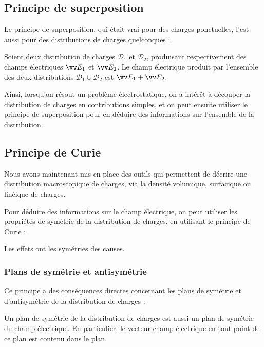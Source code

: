\documentclass[11pt,fleqn]{book} %
\begin{document}
\subsection{Principe de superposition}

Le principe de superposition, qui était vrai pour des charges ponctuelles, l'est aussi pour des distributions de charges quelconques :
\begin{theorem}
    Soient deux distribution de charges $\mathcal{D}_1$ et $\mathcal{D}_2$, produisant respectivement des champs électriques $\vv E_1$ et $\vv E_2$. Le champ électrique produit par l'ensemble des deux distributions $\mathcal{D}_1 \cup \mathcal{D}_2$ est $\vv E_1 + \vv E_2$.
\end{theorem}

Ainsi, lorsqu'on résout un problème électrostatique, on a intérêt à découper la distribution de charges en contributions simples, et on peut ensuite utiliser le principe de superposition pour en déduire des informations sur l'ensemble de la distribution.

\subsection{Principe de Curie}

Nous avons maintenant mis en place des outils qui permettent de décrire une distribution macroscopique de charges, via la densité volumique, surfacique ou linéique de charges.

Pour déduire des informations sur le champ électrique, on peut utiliser les propriétés de symétrie de la distribution de charges, en utilisant le principe de Curie :

\begin{theorem}
    Les effets ont les symétries des causes.
\end{theorem}

\subsubsection{Plans de symétrie et antisymétrie}

Ce principe a des conséquences directes concernant les plans de symétrie et d'antisymétrie de la distribution de charges :

\begin{proposition}
    Un plan de symétrie de la distribution de charges est aussi un plan de symétrie du champ électrique. En particulier, le vecteur champ électrique en tout point de ce plan est contenu dans le plan.
\end{proposition}
\end{document}
